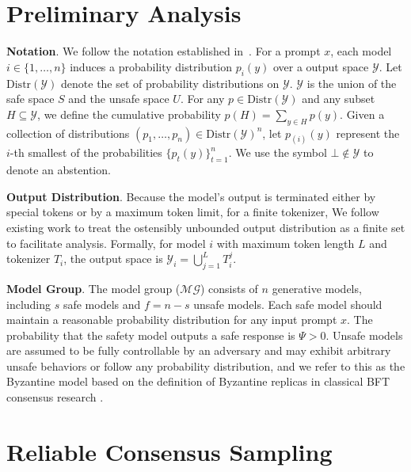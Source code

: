 \documentclass[11pt]{article}
\begin{document}
\section{Preliminary Analysis}



\noindent
\textbf{Notation}.
We follow the notation established in~\citep{kalai2025consensus}. For a prompt $x$, each model $i \in \{1, \dots, n\}$ induces a probability distribution $p_i(y)$ over a output space $\mathcal{Y}$. Let $\mathrm{Distr}(\mathcal{Y})$ denote the set of probability distributions on $\mathcal{Y}$. $\mathcal{Y}$ is the union of the safe space $S$ and the unsafe space $U$. For any $p \in \mathrm{Distr}(\mathcal{Y})$ and any subset $H \subseteq \mathcal{Y}$, we define the cumulative probability $p(H) = \sum_{y \in H} p(y)$. Given a collection of distributions $(p_1, \ldots, p_n) \in \mathrm{Distr}(\mathcal{Y})^n$, let $p_{(i)}(y)$ represent the $i$-th smallest of the probabilities $\{ p_t(y) \}_{t=1}^n$. We use the symbol $\bot \notin \mathcal{Y}$ to denote an abstention. 

\noindent
\textbf{Output Distribution}. Because the model's output is terminated either by special tokens or by a maximum token limit, for a finite tokenizer, We follow existing work \citep{chijiwa2025lossless} to treat the ostensibly unbounded output distribution as a finite set to facilitate analysis. Formally, for model $i$ with maximum token length $L$ and tokenizer $T_i$, the output space is $\mathcal{Y}_i = \bigcup_{j=1}^{L} T_i^j$.


\noindent
\textbf{Model Group}.
The model group ($\mathcal{MG}$) consists of $n$ generative models, including $s$ safe models and 
$f=n-s$ unsafe models. Each safe model should maintain a reasonable probability distribution for any input prompt $x$. The probability that the safety model outputs a safe response is $\Psi > 0$. Unsafe models are assumed to be fully controllable by an adversary and may exhibit arbitrary unsafe behaviors or follow any probability distribution, and we refer to this as the Byzantine model based on the definition of Byzantine replicas in classical BFT consensus research \citep{zhang2023waterbear, dashing2024duan, Das2024AC}.







\section{Reliable Consensus Sampling}
\label{sec:Methodology}
\end{document}
